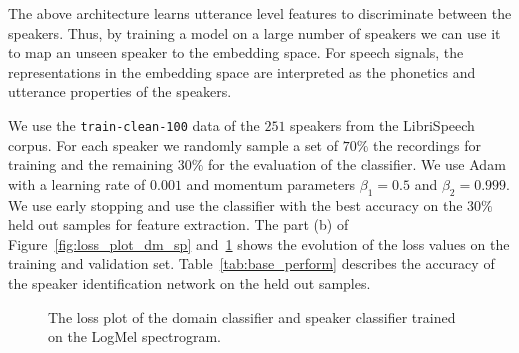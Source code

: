 The above architecture learns utterance level features to discriminate between the speakers. Thus, by training a model on a large number of speakers we can use it to map an unseen speaker to the embedding space. For speech signals, the representations in the embedding space are interpreted as the phonetics and utterance properties of the speakers.

We use the \texttt{train-clean-100} data of the $251$ speakers from the LibriSpeech corpus. For each speaker we randomly sample a set of $70\%$ the recordings for training and the remaining $30\%$ for the evaluation of the classifier. %
We use Adam with a learning rate of $0.001$ and momentum parameters $\beta_1=0.5$ and $\beta_2=0.999$. We use early stopping and use the classifier with the best accuracy on the $30\%$ held out samples for feature extraction. The part (b) of Figure~\ref{fig:loss_plot_dm_sp} and~\ref{fig:loss_plot_dm_sp_logmel} shows the evolution of the loss values on the training and validation set.  Table~\ref{tab:base_perform} describes the accuracy of the speaker identification network on the held out samples.

\begin{figure}[h]
    \centering
    \qquad
    \caption[Loss plot of evaluation models (a)]{The loss plot of the domain classifier and speaker classifier trained on the LogMel spectrogram.}
    \label{fig:loss_plot_dm_sp_logmel}
\end{figure}

